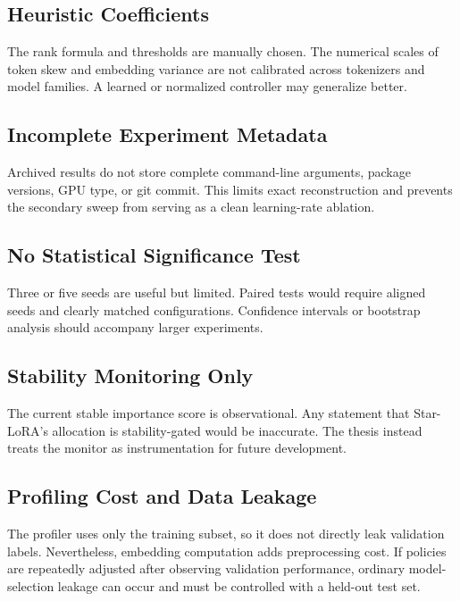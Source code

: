 \subsection{Heuristic Coefficients}

The rank formula and thresholds are manually chosen. The numerical scales of token skew and
embedding variance are not calibrated across tokenizers and model families. A learned or
normalized controller may generalize better.

\subsection{Incomplete Experiment Metadata}

Archived results do not store complete command-line arguments, package versions, GPU type, or git
commit. This limits exact reconstruction and prevents the secondary sweep from serving as a clean
learning-rate ablation.

\subsection{No Statistical Significance Test}

Three or five seeds are useful but limited. Paired tests would require aligned seeds and clearly
matched configurations. Confidence intervals or bootstrap analysis should accompany larger
experiments.

\subsection{Stability Monitoring Only}

The current stable importance score is observational. Any statement that Star-LoRA's allocation is
stability-gated would be inaccurate. The thesis instead treats the monitor as instrumentation for
future development.

\subsection{Profiling Cost and Data Leakage}

The profiler uses only the training subset, so it does not directly leak validation labels.
Nevertheless, embedding computation adds preprocessing cost. If policies are repeatedly adjusted
after observing validation performance, ordinary model-selection leakage can occur and must be
controlled with a held-out test set.

